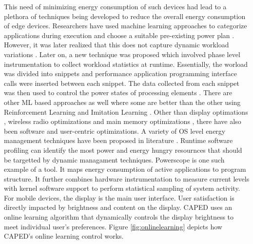 This need of minimizing energy consumption of such devices had lead to a plethora of techniques being developed to 
reduce the overall energy consumption of edge devices. Researchers have used machine learning approaches to 
categorize applications during execution and choose a suitable pre-existing power plan \cite{power,7851469,4838819}. 
However, it was later realized that this does not capture dynamic workload variations \cite{5751506}. Later on, a new 
technique was proposed which involved phase level instrumentation to collect workload statistics at runtime. Essentially, 
the worload was divided into snippets and performance application programming interface calls were inserted between 
each snippet. The data collected from each snippet was then used to control the power states of processing elements \cite{dypo}. 
There are other ML based approaches as well where some are better than the other using Reinforcement Learning and 
Imitation Learning \cite{7092630,7163527,8449105,8607043,DBLP:journals/corr/abs-1011-0686,7934357,8770273}. Other than 
display optimations \cite{7544394,Dong2009PowersavingCT,187123}, wireless radio optimizations \cite{enloc,ener,min,delay,194920,180309} and 
main memory optimizations \cite{7266864}, there have also been software and user-centric optimizations. A variety of 
OS level energy management techniques have been  proposed in literature \cite{erdos,mob}. Runtime software profiling 
can identify the most power and energy hungry resournces that should be targetted by dynamic managament techniques. 
Powerscope \cite{powerscope} is one such example of a tool. It maps energy consumption of active applications to program 
structure. It further combines hardware instrumentation to measure current levels with kernel software support to 
perform statistical sampling of system activity. For mobile devices, the display is the main user interface. User 
satisfaction is directly impacted by brightness and content on the display. CAPED \cite{6972472} uses an online 
learning algorithm that dynamically controls the display brightness to meet individual user's preferences. Figure 
\ref{fig:onlinelearning} depicts how CAPED's online learning control works. \\

